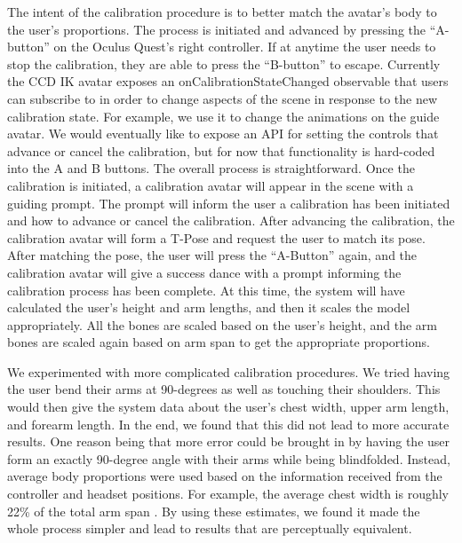 \documentclass{vgtc}                          %
\begin{document}
    The intent of the calibration procedure is to better match the avatar’s body to the user’s proportions. The process is initiated and advanced by pressing the “A-button” on the Oculus Quest’s right controller. If at anytime the user needs to stop the calibration, they are able to press the “B-button” to escape. Currently the CCD IK avatar exposes an onCalibrationStateChanged observable that users can subscribe to in order to change aspects of the scene in response to the new calibration state. For example, we use it to change the animations on the guide avatar. We would eventually like to expose an API for setting the controls that advance or cancel the calibration, but for now that functionality is hard-coded into the A and B buttons. The overall process is straightforward. Once the calibration is initiated, a calibration avatar will appear in the scene with a guiding prompt. The prompt will inform the user a calibration has been initiated and how to advance or cancel the calibration. After advancing the calibration, the calibration avatar will form a T-Pose and request the user to match its pose. After matching the pose, the user will press the “A-Button” again, and the calibration avatar will give a success dance with a prompt informing the calibration process has been complete. At this time, the system will have calculated the user’s height and arm lengths, and then it scales the model appropriately. All the bones are scaled based on the user’s height, and the arm bones are scaled again based on arm span to get the appropriate proportions.

    We experimented with more complicated calibration procedures. We tried having the user bend their arms at 90-degrees as well as touching their shoulders. This would then give the system data about the user’s chest width, upper arm length, and forearm length. In the end, we found that this did not lead to more accurate results. One reason being that more error could be brought in by having the user form an exactly 90-degree angle with their arms while being blindfolded. Instead, average body proportions were used based on the information received from the controller and headset positions. For example, the average chest width is roughly 22\% of the total arm span \cite{openlab}. By using these estimates, we found it made the whole process simpler and lead to results that are perceptually equivalent. 
\end{document}
